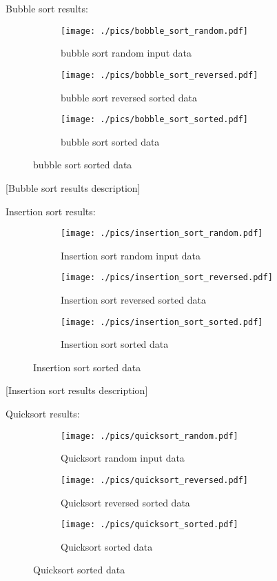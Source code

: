 
Bubble sort results:

\begin{figure}[H]
	\centering
	\begin{subfigure}[b]{0.5\textwidth}
		\centering
		\texttt{[image: ./pics/bobble\_sort\_random.pdf]}
		\caption{bubble sort random input data}
	\end{subfigure}
	\hfill
	\begin{subfigure}[b]{0.5\textwidth}
		\centering
		\texttt{[image: ./pics/bobble\_sort\_reversed.pdf]}
		\caption{bubble sort reversed sorted data}
	\end{subfigure}
	\hfill
	\begin{subfigure}[b]{0.5\textwidth}
		\centering
		\texttt{[image: ./pics/bobble\_sort\_sorted.pdf]}
		\caption{bubble sort sorted data}
	\end{subfigure}
\end{figure}

[Bubble sort results description]

Insertion sort results:

\begin{figure}[H]
	\centering
	\begin{subfigure}[b]{0.5\textwidth}
		\centering
		\texttt{[image: ./pics/insertion\_sort\_random.pdf]}
		\caption{Insertion sort random input data}
	\end{subfigure}
	\hfill
	\begin{subfigure}[b]{0.5\textwidth}
		\centering
		\texttt{[image: ./pics/insertion\_sort\_reversed.pdf]}
		\caption{Insertion sort reversed sorted data}
	\end{subfigure}
	\hfill
	\begin{subfigure}[b]{0.5\textwidth}
		\centering
		\texttt{[image: ./pics/insertion\_sort\_sorted.pdf]}
		\caption{Insertion sort sorted data}
	\end{subfigure}
\end{figure}

[Insertion sort results description]

Quicksort results:

\begin{figure}[H]
	\centering
	\begin{subfigure}[b]{0.5\textwidth}
		\centering
		\texttt{[image: ./pics/quicksort\_random.pdf]}
		\caption{Quicksort random input data}
	\end{subfigure}
	\hfill
	\begin{subfigure}[b]{0.5\textwidth}
		\centering
		\texttt{[image: ./pics/quicksort\_reversed.pdf]}
		\caption{Quicksort reversed sorted data}
	\end{subfigure}
	\hfill
	\begin{subfigure}[b]{0.5\textwidth}
		\centering
		\texttt{[image: ./pics/quicksort\_sorted.pdf]}
		\caption{Quicksort sorted data}
	\end{subfigure}
\end{figure}

